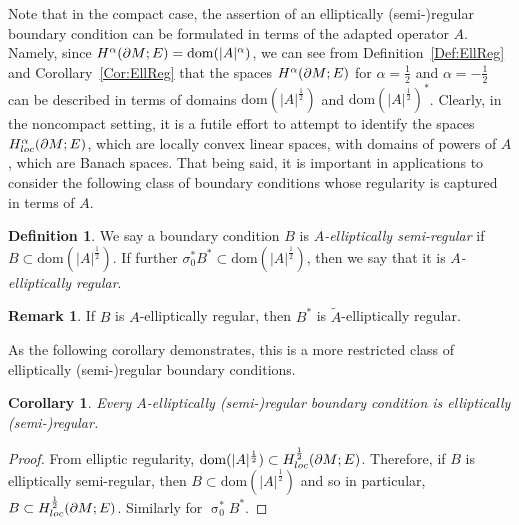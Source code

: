 \documentclass[a4paper,10pt,reqno]{amsart}
\newcommand{\sym}{\upsigma}
\newcommand{\modulus}[1]{|#1|}
\newcommand{\Hard}[2][{}]{{\rm H}^{#2}_{\rm #1}}%
\newcommand{\SobH}[2][{}]{\Hard[#1]{\rm #2}}
\newcommand{\dom}{\mathrm{dom}}
\newcommand{\dM}{\partial M}
\newtheorem{corollary}[theorem]{Corollary}
\theoremstyle{definition}
\newtheorem{definition}[theorem]{Definition}
\newtheorem{remark}[theorem]{Remark}
\begin{document}
Note that in the compact case, the assertion of an elliptically (semi-)regular boundary condition can be formulated in terms of the adapted operator $A$.
Namely, since $\SobH{\alpha}(\dM;E) = \dom(\modulus{A}^\alpha)$, we can see from Definition~\ref{Def:EllReg} and Corollary~\ref{Cor:EllReg} that the spaces $\SobH{\alpha}(\dM;E)$ for $\alpha = \frac12$ and $\alpha = -\frac12$  can be described in terms of domains $\dom(\modulus{A}^{\frac12})$ and $\dom(\modulus{A}^{\frac12})^\ast$.
Clearly, in the noncompact setting, it is a futile effort to attempt to identify the spaces $\SobH[loc]{\alpha}(\dM;E)$, which are locally convex linear spaces, with domains of powers of $A$, which are Banach spaces.
That being said,  it is important in applications to consider the following class of boundary conditions whose regularity is captured in terms of $A$.

\begin{definition}
\label{Def:AEllReg}
We say a boundary condition $B$ is \emph{$A$-elliptically semi-regular} if $B \subset \dom(\modulus{A}^{\frac12})$.
If further $\sigma_0^\ast B^\ast \subset \dom(\modulus{A}^{\frac12})$, then we say that it is \emph{$A$-elliptically regular}.
\end{definition}

\begin{remark}
If $B$ is $A$-elliptically regular, then $B^*$ is $\tilde{A}$-elliptically regular.
\end{remark}

As the following corollary demonstrates, this is a more restricted class of elliptically (semi-)regular boundary conditions. 

\begin{corollary}
\label{Cor:AEllReg}
Every $A$-elliptically (semi-)regular boundary condition is elliptically (semi-)regular.
\end{corollary}
\begin{proof}
From elliptic regularity, $\dom(\modulus{A}^{\frac12}) \subset \SobH[loc]{\frac12}(\dM;E)$.
Therefore, if $B$ is elliptically semi-regular, then $B \subset \dom(\modulus{A}^{\frac12})$ and so in particular, $B \subset \SobH[loc]{\frac12}(\dM;E)$.
Similarly for $\sym_0^\ast B^\ast$.
\end{proof}
\end{document}
